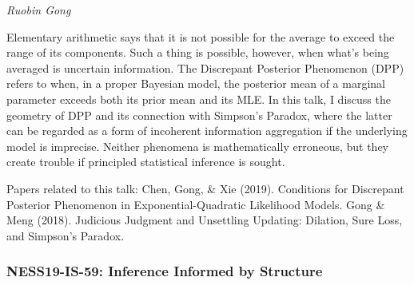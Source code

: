 \begin{itemize}
\emph{\footnotesize Ruobin Gong}

Elementary arithmetic says that it is not possible for the average to exceed the range of its components. Such a thing is possible, however, when what's being averaged is uncertain information. The Discrepant Posterior Phenomenon (DPP) refers to when, in a proper Bayesian model, the posterior mean of a marginal parameter exceeds both its prior mean and its MLE.  In this talk, I discuss the geometry of DPP and its connection with Simpson’s Paradox, where the latter can be regarded as a form of incoherent information aggregation if the underlying model is imprecise. Neither phenomena is mathematically erroneous, but they create trouble if principled statistical inference is sought.

Papers related to this talk:
Chen, Gong, \& Xie (2019). Conditions for Discrepant Posterior Phenomenon in Exponential-Quadratic Likelihood Models.
Gong \& Meng (2018). Judicious Judgment and Unsettling Updating: Dilation, Sure Loss, and Simpson’s Paradox.

\end{itemize}

\subsubsection*{NESS19-IS-59: Inference Informed by Structure}

